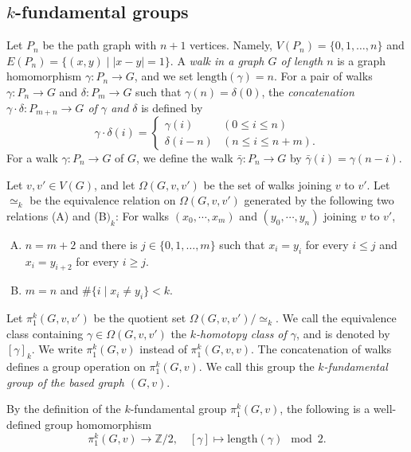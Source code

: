 \documentclass[11pt, amsfonts]{amsart}
\numberwithin{equation}{section}
\theoremstyle{definition}
\theoremstyle{remark}
\newcommand{\ZZ}{\mathbb{Z}}
\begin{document}
\subsection{$k$-fundamental groups} \label{subsection k-fundamental group}
Let $P_n$ be the path graph with $n + 1$ vertices. Namely, $V(P_n) = \{ 0,1,\ldots, n\}$ and $E(P_n) = \{ (x,y) \mid |x - y| = 1\}$. A \emph{walk in a graph $G$ of length $n$} is a graph homomorphism $\gamma \colon P_n \to G$, and we set $\mathrm{length}(\gamma) = n$. For a pair of walks $\gamma \colon P_n \to G$ and $\delta \colon P_m \to G$ such that $\gamma(n) = \delta(0)$, the \emph{concatenation $\gamma \cdot \delta \colon P_{m+n} \to G$ of $\gamma$ and $\delta$} is defined by
\[ \gamma \cdot \delta (i) = \begin{cases}
\gamma(i) & (0 \le i \le n)\\
\delta(i - n) & (n \le i \le n + m).
\end{cases}\]
For a walk $\gamma \colon P_n \to G$ of $G$, we define the walk $\bar{\gamma} \colon P_n \to G$ by $\bar{\gamma}(i) = \gamma(n-i)$.

Let $v,v' \in V(G)$, and let $\Omega (G,v,v')$ be the set of walks joining $v$ to $v'$. Let $\simeq_k$ be the equivalence relation on $\Omega(G,v,v')$ generated by the following two relations (A) and (B$)_k$: For walks $(x_0, \cdots, x_m)$ and $(y_0, \cdots, y_n)$ joining $v$ to $v'$,
\begin{enumerate}[(A)]
\item[(A)] $n = m + 2$ and there is $j \in \{ 0,1,\ldots, m\}$ such that $x_i = y_i$ for every $i \le j$ and $x_i = y_{i+2}$ for every $i \ge j$.

\item[(B)$_k$] $m = n$ and $\# \{ i \mid x_i \ne y_i\} < k$.
\end{enumerate}

Let $\pi_1^k(G,v,v')$ be the quotient set $\Omega(G,v,v') / {\simeq_k}$. We call the equivalence class containing $\gamma \in \Omega(G,v,v')$ the \emph{$k$-homotopy class of $\gamma$}, and is denoted by $[\gamma]_k$. We write $\pi_1^k(G,v)$ instead of $\pi_1^k(G,v,v)$. The concatenation of walks defines a group operation on $\pi_1^k(G,v)$. We call this group the \emph{$k$-fundamental group of the based graph $(G,v)$}.

By the definition of the $k$-fundamental group $\pi_1^k(G,v)$, the following is a well-defined group homomorphism
\begin{equation} \label{parity hom}
\pi_1^k(G,v) \to \ZZ / 2, \quad [\gamma] \mapsto \mathrm{length}(\gamma)\mod 2.
\end{equation}
\end{document}
